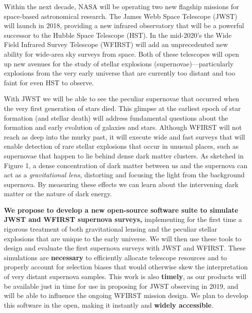 \thispagestyle{fancy}
\lhead{}
\rhead{}
\renewcommand{\headrulewidth}{1pt}
\renewcommand{\footrulewidth}{0pt}
\fancyfoot[C]{}

\pagestyle{fancy}

Within the next decade, NASA will be operating two new flagship
missions for space-based astronomical research.  The James Webb Space
Telescope (JWST) will launch in 2018, providing a new infrared
observatory that will be a powerful successor to the Hubble Space
Telescope (HST).  In the mid-2020's the Wide Field Infrared Survey
Telescope (WFIRST) will add an unprecedented new ability for wide-area
sky surveys from space.  Both of these telescopes will open up new
avenues for the study of stellar explosions (supernovae)---particularly
explosions from the very early universe that are currently too distant
and too faint for even HST to observe.

With JWST we will be able to see the peculiar supernovae that occurred
when the very first generation of stars died.  This glimpse at the
earliest epoch of star formation (and stellar death) will address
fundamental questions about the formation and early evolution of
galaxies and stars. Although WFIRST will not reach as deep into the
murky past, it will execute wide and fast surveys that will enable
detection of rare stellar explosions that occur in unusual places,
such as supernovae that happen to lie behind dense dark matter
clusters.  As sketched in Figure 1, a dense concentration of dark
matter between us and the supernova can act as a {\it gravitational
lens,} distorting and focusing the light from the background
supernova.  By measuring these effects we can learn about the
intervening dark matter or the nature of dark energy.

{\bf We propose to develop a new open-source software suite to
  simulate JWST and WFIRST supernova surveys,} implementing for the
first time a rigorous treatment of both gravitational lensing and the
peculiar stellar explosions that are unique to the early universe.  We
will then use these tools to design and evaluate the first supernova
surveys with JWST and WFIRST.  These simulations are {\bf necessary}
to efficiently allocate telescope resources and to properly account
for selection biases that would otherwise skew the interpretation of
very distant supernova samples.  This work is also {\bf timely}, as
our products will be available just in time for use in proposing for
JWST observing in 2019, and will be able to influence the ongoing
WFIRST mission design.  We plan to develop this software in the open,
making it instantly and {\bf widely accessible}.


